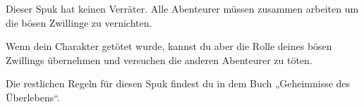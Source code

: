 

Dieser Spuk hat keinen Verräter.
Alle Abenteurer müssen zusammen arbeiten um die bösen Zwillinge zu vernichten.

Wenn dein Charakter getötet wurde, kannst du aber die Rolle deines bösen Zwillings übernehmen und versuchen die anderen Abenteurer zu töten.

Die restlichen Regeln für diesen Spuk findest du in dem Buch „Geheimnisse des Überlebens“.
